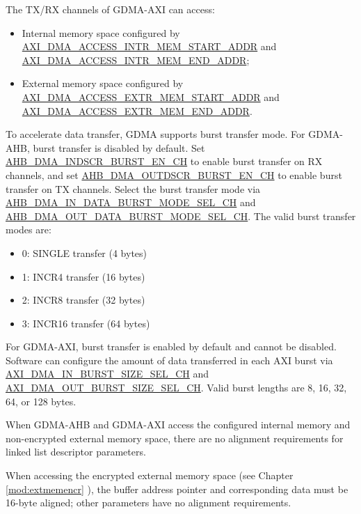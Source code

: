 \documentclass[main\_\_EN.tex]{subfiles}
\begin{document}
The TX/RX channels of GDMA-AXI can access:
\begin{itemize}
    \item Internal memory space configured by \hyperref[fielddesc:AXIDMAACCESSINTRMEMSTARTADDR]{AXI\_DMA\_ACCESS\_INTR\_MEM\_START\_ADDR} and \hyperref[fielddesc:AXIDMAACCESSINTRMEMENDADDR]{AXI\_DMA\_ACCESS\_INTR\_MEM\_END\_ADDR};
    \item External memory space configured by \hyperref[fielddesc:AXIDMAACCESSEXTRMEMSTARTADDR]{AXI\_DMA\_ACCESS\_EXTR\_MEM\_START\_ADDR} and \hyperref[fielddesc:AXIDMAACCESSEXTRMEMENDADDR]{AXI\_DMA\_ACCESS\_EXTR\_MEM\_END\_ADDR}.
\end{itemize}

To accelerate data transfer, GDMA supports burst transfer mode. For GDMA-AHB, burst transfer is disabled by default. Set \hyperref[fielddesc:AHBDMAINDSCRBURSTENCHN]{AHB\_DMA\_INDSCR\_BURST\_EN\_CH} to enable burst transfer on RX channels, and set \hyperref[fielddesc:AHBDMAOUTDSCRBURSTENCHN]{AHB\_DMA\_OUTDSCR\_BURST\_EN\_CH} to enable burst transfer on TX channels. Select the burst transfer mode via \hyperref[fielddesc:AHBDMAINDATABURSTMODESELCHN]{AHB\_DMA\_IN\_DATA\_BURST\_MODE\_SEL\_CH} and \hyperref[fielddesc:AHBDMAOUTDATABURSTMODESELCHN]{AHB\_DMA\_OUT\_DATA\_BURST\_MODE\_SEL\_CH}. The valid burst transfer modes are:
\begin{itemize}
    \item 0: SINGLE transfer (4 bytes)
    \item 1: INCR4 transfer (16 bytes)
    \item 2: INCR8 transfer (32 bytes)
    \item 3: INCR16 transfer (64 bytes)
\end{itemize}

For GDMA-AXI, burst transfer is enabled by default and cannot be disabled. Software can configure the amount of data transferred in each AXI burst via \hyperref[fielddesc:AXIDMAINBURSTSIZESELCHN]{AXI\_DMA\_IN\_BURST\_SIZE\_SEL\_CH} and \hyperref[fielddesc:AXIDMAOUTBURSTSIZESELCHN]{AXI\_DMA\_OUT\_BURST\_SIZE\_SEL\_CH}. Valid burst lengths are 8, 16, 32, 64, or 128 bytes.

When GDMA-AHB and GDMA-AXI access the configured internal memory and non-encrypted external memory space, there are no alignment requirements for linked list descriptor parameters.

When accessing the encrypted external memory space (see Chapter \ref{mod:extmemencr} \textit{}), the buffer address pointer and corresponding data must be 16-byte aligned; other parameters have no alignment requirements.
\end{document}

